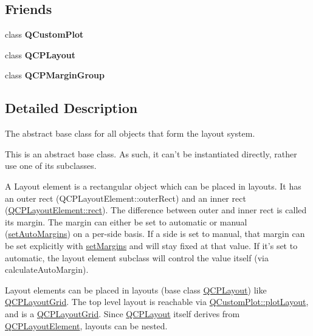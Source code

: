\subsection*{\-Friends}
\begin{DoxyCompactItemize}
\item 
\hypertarget{classQCPLayoutElement_a1cdf9df76adcfae45261690aa0ca2198}{class {\bfseries \-Q\-Custom\-Plot}}\label{classQCPLayoutElement_a1cdf9df76adcfae45261690aa0ca2198}

\item 
\hypertarget{classQCPLayoutElement_a588aac0a0d721f6c5f10126d8596a20f}{class {\bfseries \-Q\-C\-P\-Layout}}\label{classQCPLayoutElement_a588aac0a0d721f6c5f10126d8596a20f}

\item 
\hypertarget{classQCPLayoutElement_ad077a686e85ab6fa03dcb2fd37fc499a}{class {\bfseries \-Q\-C\-P\-Margin\-Group}}\label{classQCPLayoutElement_ad077a686e85ab6fa03dcb2fd37fc499a}

\end{DoxyCompactItemize}


\subsection{\-Detailed \-Description}
\-The abstract base class for all objects that form the layout system. 

\-This is an abstract base class. \-As such, it can't be instantiated directly, rather use one of its subclasses.

\-A \-Layout element is a rectangular object which can be placed in layouts. \-It has an outer rect (\-Q\-C\-P\-Layout\-Element\-::outer\-Rect) and an inner rect (\hyperlink{classQCPLayoutElement_affdfea003469aac3d0fac5f4e06171bc}{\-Q\-C\-P\-Layout\-Element\-::rect}). \-The difference between outer and inner rect is called its margin. \-The margin can either be set to automatic or manual (\hyperlink{classQCPLayoutElement_accfda49994e3e6d51ed14504abf9d27d}{set\-Auto\-Margins}) on a per-\/side basis. \-If a side is set to manual, that margin can be set explicitly with \hyperlink{classQCPLayoutElement_a8f450b1f3f992ad576fce2c63d8b79cf}{set\-Margins} and will stay fixed at that value. \-If it's set to automatic, the layout element subclass will control the value itself (via calculate\-Auto\-Margin).

\-Layout elements can be placed in layouts (base class \hyperlink{classQCPLayout}{\-Q\-C\-P\-Layout}) like \hyperlink{classQCPLayoutGrid}{\-Q\-C\-P\-Layout\-Grid}. \-The top level layout is reachable via \hyperlink{classQCustomPlot_afd280d4d621ae64a106543a545c508d7}{\-Q\-Custom\-Plot\-::plot\-Layout}, and is a \hyperlink{classQCPLayoutGrid}{\-Q\-C\-P\-Layout\-Grid}. \-Since \hyperlink{classQCPLayout}{\-Q\-C\-P\-Layout} itself derives from \hyperlink{classQCPLayoutElement}{\-Q\-C\-P\-Layout\-Element}, layouts can be nested.


